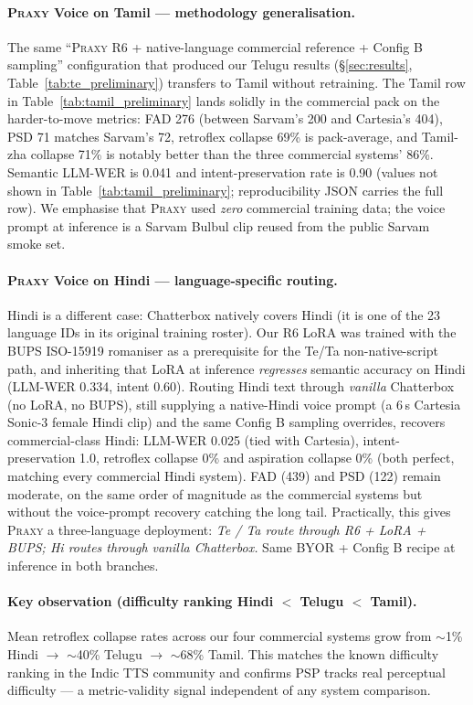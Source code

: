 \documentclass[conference,a4paper]{IEEEtran}
\newcommand{\praxy}{\textsc{Praxy}}
\begin{document}
\paragraph{\praxy{} Voice on Tamil — methodology generalisation.} The same ``\praxy{} R6 + native-language commercial reference + Config B sampling'' configuration that produced our Telugu results (§\ref{sec:results}, Table~\ref{tab:te_preliminary}) transfers to Tamil without retraining. The Tamil row in Table~\ref{tab:tamil_preliminary} lands solidly in the commercial pack on the harder-to-move metrics: FAD 276 (between Sarvam's 200 and Cartesia's 404), PSD 71 matches Sarvam's 72, retroflex collapse 69\% is pack-average, and Tamil-zha collapse 71\% is notably better than the three commercial systems' 86\%. Semantic LLM-WER is 0.041 and intent-preservation rate is 0.90 (values not shown in Table~\ref{tab:tamil_preliminary}; reproducibility JSON carries the full row). We emphasise that \praxy{} used \emph{zero} commercial training data; the voice prompt at inference is a Sarvam Bulbul clip reused from the public Sarvam smoke set.

\paragraph{\praxy{} Voice on Hindi --- language-specific routing.} Hindi is a different case: Chatterbox natively covers Hindi (it is one of the 23 language IDs in its original training roster). Our R6 LoRA was trained with the BUPS ISO-15919 romaniser as a prerequisite for the Te/Ta non-native-script path, and inheriting that LoRA at inference \emph{regresses} semantic accuracy on Hindi (LLM-WER 0.334, intent 0.60). Routing Hindi text through \emph{vanilla} Chatterbox (no LoRA, no BUPS), still supplying a native-Hindi voice prompt (a 6\,s Cartesia Sonic-3 female Hindi clip) and the same Config B sampling overrides, recovers commercial-class Hindi: LLM-WER 0.025 (tied with Cartesia), intent-preservation 1.0, retroflex collapse 0\% and aspiration collapse 0\% (both perfect, matching every commercial Hindi system). FAD (439) and PSD (122) remain moderate, on the same order of magnitude as the commercial systems but without the voice-prompt recovery catching the long tail. Practically, this gives \praxy{} a three-language deployment: \emph{Te / Ta route through R6 + LoRA + BUPS; Hi routes through vanilla Chatterbox.} Same BYOR + Config B recipe at inference in both branches.

\paragraph{Key observation (difficulty ranking Hindi $<$ Telugu $<$ Tamil).} Mean retroflex collapse rates across our four commercial systems grow from $\sim$1\% Hindi $\to$ $\sim$40\% Telugu $\to$ $\sim$68\% Tamil. This matches the known difficulty ranking in the Indic TTS community and confirms PSP tracks real perceptual difficulty — a metric-validity signal independent of any system comparison.
\end{document}
